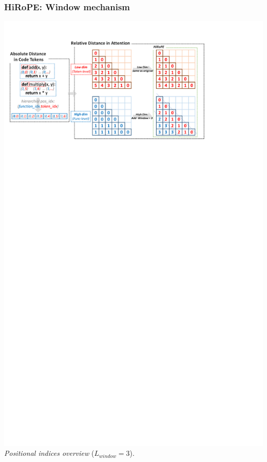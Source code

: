 \documentclass[notheorems,10pt]{beamer}
\begin{document}
\begin{frame}
    \frametitle{HiRoPE: Window mechanism}

    \begin{center}
        \includegraphics[width=1.0\textwidth]{attachments/window-mechanism.pdf}
        \\[1ex]
        \textit{Positional indices overview} ($L_{window}=3$).
    \end{center}
\end{frame}
\end{document}
